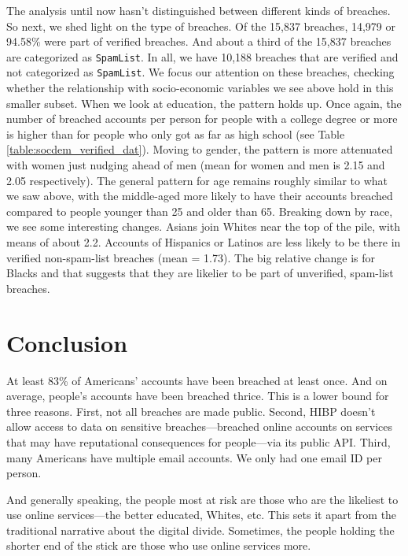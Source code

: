 \documentclass[12pt, letterpaper]{article}
\begin{document}
The analysis until now hasn't distinguished between different kinds of breaches. So next, we shed light on the type of breaches.  Of the 15,837 breaches, 14,979 or 94.58\% were part of verified breaches. And about a third of the 15,837 breaches are categorized as \texttt{SpamList}. In all, we have 10,188 breaches that are verified and not categorized as \texttt{SpamList}. We focus our attention on these breaches, checking whether the relationship with socio-economic variables we see above hold in this smaller subset. When we look at education, the pattern holds up. Once again, the number of breached accounts per person for people with a college degree or more is higher than for people who only got as far as high school (see Table \ref{table:socdem_verified_dat}). Moving to gender, the pattern is more attenuated with women just nudging ahead of men (mean for women and men is 2.15 and 2.05 respectively).  The general pattern for age remains roughly similar to what we saw above, with the middle-aged more likely to have their accounts breached compared to people younger than 25 and older than 65. Breaking down by race, we see some interesting changes. Asians join Whites near the top of the pile, with means of about 2.2. Accounts of Hispanics or Latinos are less likely to be there in verified non-spam-list breaches (mean = 1.73). The big relative change is for Blacks and that suggests that they are likelier to be part of unverified, spam-list breaches.



\section*{Conclusion}
At least 83\% of Americans' accounts have been breached at least once. And on average, people's accounts have been breached thrice. This is a lower bound for three reasons. First, not all breaches are made public. Second, HIBP doesn't allow access to data on sensitive breaches---breached online accounts on services that may have reputational consequences for people---via its public API. Third, many Americans have multiple email accounts. We only had one email ID per person. 

And generally speaking, the people most at risk are those who are the likeliest to use online services---the better educated, Whites, etc. This sets it apart from the traditional narrative about the digital divide. Sometimes, the people holding the shorter end of the stick are those who use online services more. 
\end{document}
